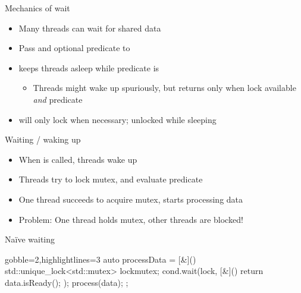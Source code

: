 \begin{frame}[fragile]
  \vspace{-1.2\baselineskip}
  \begin{overprint}
  \begin{block}{Mechanics of wait}
    \begin{itemize}
      \item Many threads can wait for shared data
      \item Pass  and optional predicate to 
      \item {} keeps threads asleep while predicate is 
      \begin{itemize}
        \item Threads might wake up spuriously, but  returns only when lock available \emph{and} predicate 
      \end{itemize}
      \item {} will only lock when necessary; unlocked while sleeping
    \end{itemize}
  \end{block}
  \begin{block}{Waiting / waking up}
    \begin{itemize}
      \item When  is called, threads wake up
      \item Threads try to lock mutex, and evaluate predicate
      \item One thread succeeds to acquire mutex, starts processing data
      \item {\color{red} Problem}: One thread holds mutex, other threads are blocked!
    \end{itemize}
  \end{block}
  \end{overprint}

  \begin{alertblock}{Na\"ive waiting}
    \begin{cppcode*}{gobble=2,highlightlines=3}
      auto processData = [&](){
        std::unique_lock<std::mutex> lock{mutex};
        cond.wait(lock, [&](){ return data.isReady(); });
        process(data);
      };
    \end{cppcode*}
  \end{alertblock}
\end{frame}

